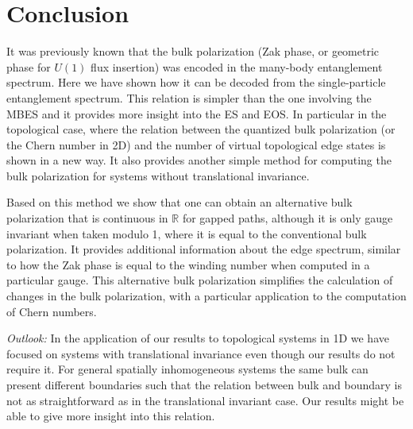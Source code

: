 \documentclass[twocolumn,amsmath,longbibliography,amssymb,superscriptaddress]{revtex4-1}
\newcommand{\tpo}{\tilde{\mathcal{P}}_{\rm o}}
\begin{document}
%
%
%




\section{Conclusion}

It was previously known that the bulk polarization (Zak phase, or geometric phase for $U(1)$ flux insertion) was encoded in the many-body entanglement spectrum. Here we have shown how it can be decoded from the single-particle entanglement spectrum. This relation is simpler than the one involving the MBES and it provides more insight into the ES and EOS. In particular in the topological case, where the relation between the quantized bulk polarization (or the Chern number in 2D) and the number of virtual topological edge states is shown in a new way. It also provides another simple method for computing the bulk polarization for systems without translational invariance. 

Based on this method we show that one can obtain an alternative bulk polarization that is continuous in $\mathbb{R}$ for gapped paths, although it is only gauge invariant when taken modulo 1, where it is equal to the conventional bulk polarization. It provides additional information about the edge spectrum, similar to how the Zak phase is equal to the winding number when computed in a particular gauge. This alternative bulk polarization simplifies the calculation of changes in the bulk polarization, with a particular application to the computation of Chern numbers.

\emph{Outlook:} In the application of our results to topological systems in 1D we have focused on systems with translational invariance even though our results do not require it. For general spatially inhomogeneous systems the same bulk can present different boundaries such that the relation between bulk and boundary is not as straightforward as in the translational invariant case. Our results might be able to give more insight into this relation. 
\end{document}
